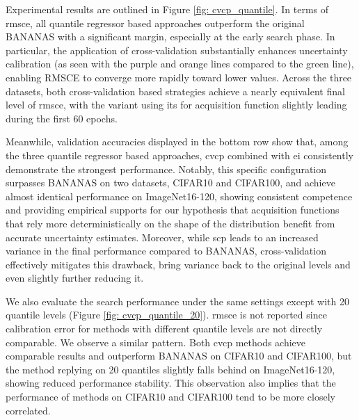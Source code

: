 \documentclass[a4paper,oneside,bibliography=totoc]{scrbook}
\begin{document}
\begin{description}[leftmargin=0cm, listparindent=\parindent]
 	Experimental results are outlined in Figure \ref{fig: cvcp_quantile}. In terms of \gls{rmsce}, all quantile regressor based approaches outperform the original BANANAS with a significant margin, especially at the early search phase. In particular, the application of cross-validation substantially enhances uncertainty calibration (as seen with the purple and orange lines compared to the green line), enabling RMSCE to converge more rapidly toward lower values. Across the three datasets, both cross-validation based strategies achieve a nearly equivalent final level of \gls{rmsce}, with the variant using \gls{its} for acquisition function slightly leading during the first 60 epochs.
 	
 	Meanwhile, validation accuracies displayed in the bottom row show that, among the three quantile regressor based approaches, \gls{cvcp} combined with \gls{ei} consistently demonstrate the strongest performance. Notably, this specific configuration surpasses BANANAS on two datasets, CIFAR10 and CIFAR100, and achieve almost identical performance on ImageNet16-120, showing consistent competence and providing empirical supports for our hypothesis that acquisition functions that rely more deterministically on the shape of the distribution benefit from accurate uncertainty estimates.	Moreover, while \gls{scp} leads to an increased variance in the final performance compared to BANANAS, cross-validation effectively mitigates this drawback, bring variance back to the original levels and even slightly further reducing it. 
 	
 	We also evaluate the search performance under the same settings except with 20 quantile levels (Figure \ref{fig: cvcp_quantile_20}). \gls{rmsce} is not reported since calibration error for methods with different quantile levels are not directly comparable. We observe a similar pattern. Both \gls{cvcp} methods achieve comparable results and outperform BANANAS on CIFAR10 and CIFAR100, but the method replying on 20 quantiles slightly falls behind on ImageNet16-120, showing reduced performance stability. This observation also implies that the performance of methods on CIFAR10 and CIFAR100 tend to be more closely correlated.
 	

\end{description}
\end{document}
